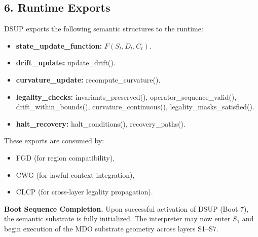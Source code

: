\subsection*{6. Runtime Exports}
\label{boot:dsup_exports}

DSUP exports the following semantic structures to the runtime:

\begin{itemize}[leftmargin=1.2cm]
    \item \textbf{state\_update\_function:}
    $F(S_t, D_t, C_t)$.
    \item \textbf{drift\_update:}
    update\_drift().
    \item \textbf{curvature\_update:}
    recompute\_curvature().
    \item \textbf{legality\_checks:}
    invariants\_preserved(), operator\_sequence\_valid(),
    drift\_within\_bounds(), curvature\_continuous(),
    legality\_masks\_satisfied().
    \item \textbf{halt\_recovery:}
    halt\_conditions(), recovery\_paths().
\end{itemize}

These exports are consumed by:
\begin{itemize}[leftmargin=1.2cm]
    \item FGD  (for region compatibility),
    \item CWG  (for lawful context integration),
    \item CLCP (for cross-layer legality propagation).
\end{itemize}

\medskip

\noindent \textbf{Boot Sequence Completion.}  
Upon successful activation of DSUP (Boot 7), the semantic substrate is fully
initialized. The interpreter may now enter $S_1$ and begin execution of the MDO
substrate geometry across layers S1–S7.
